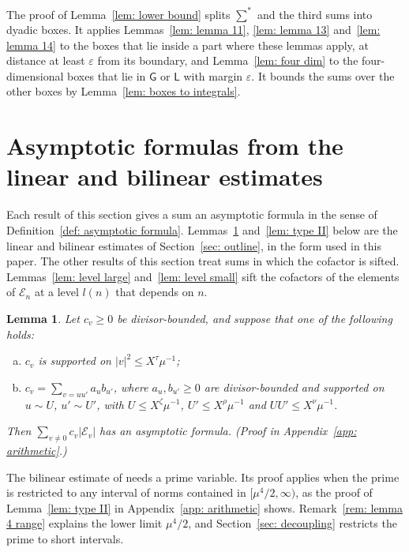 \documentclass{article}
\numberwithin{equation}{section}
\newtheorem{lemma}{Lemma}
\newcommand{\Le}{\leqslant}
\newcommand{\Ge}{\geqslant}
\begin{document}
The proof of Lemma~\ref{lem: lower bound} splits $\sum^*$ and the third sums into dyadic boxes. It applies Lemmas~\ref{lem: lemma 11}, \ref{lem: lemma 13} and~\ref{lem: lemma 14} to the boxes that lie inside a part where these lemmas apply, at distance at least $\varepsilon$ from its boundary, and Lemma~\ref{lem: four dim} to the four-dimensional boxes that lie in $\mathsf{G}$ or $\mathsf{L}$ with margin $\varepsilon$. It bounds the sums over the other boxes by Lemma~\ref{lem: boxes to integrals}.

\section{Asymptotic formulas from the linear and bilinear estimates}
\label{sec: estimates}

Each result of this section gives a sum an asymptotic formula in the sense of Definition~\ref{def: asymptotic formula}. Lemmas~\ref{lem: type I} and~\ref{lem: type II} below are the linear and bilinear estimates of Section~\ref{sec: outline}, in the form used in this paper. The other results of this section treat sums in which the cofactor is sifted. Lemmas~\ref{lem: level large} and~\ref{lem: level small} sift the cofactors of the elements of $\mathcal{E}_n$ at a level $l(n)$ that depends on $n$.

\begin{lemma}
\label{lem: type I}
Let $c_v \Ge 0$ be divisor-bounded, and suppose that one of the following holds:
\begin{enumerate}[(a)]
\item $c_v$ is supported on $|v|^2 \Le X^{\tau} \mu^{-1}$;
\item $c_v = \sum_{v = uu'} a_u b_{u'}$, where $a_u, b_{u'} \Ge 0$ are divisor-bounded and supported on $u \sim U$, $u' \sim U'$, with $U \Le X^{\zeta} \mu^{-1}$, $U' \Le X^{\rho} \mu^{-1}$ and $UU' \Le X^{\nu} \mu^{-1}$.
\end{enumerate}
Then $\sum_{v \neq 0} c_v |\mathcal{E}_v|$ has an asymptotic formula.
\emph{(Proof in Appendix~\ref{app: arithmetic}.)}
\end{lemma}

The bilinear estimate of \citet[Lemma~5 and (30)]{harman2001gaussian} needs a prime variable. Its proof applies when the prime is restricted to any interval of norms contained in $[\mu^4/2, \infty)$, as the proof of Lemma~\ref{lem: type II} in Appendix~\ref{app: arithmetic} shows. Remark~\ref{rem: lemma 4 range} explains the lower limit $\mu^4/2$, and Section~\ref{sec: decoupling} restricts the prime to short intervals.
\end{document}
